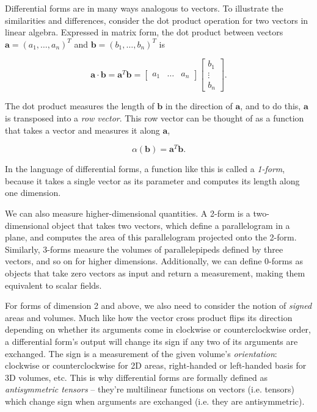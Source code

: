 \documentclass[utf8,english]{gradu3}
\begin{document}
Differential forms are in many ways analogous to vectors.
To illustrate the similarities and differences,
consider the dot product operation
for two vectors in linear algebra.
Expressed in matrix form, the dot product between vectors
$\mathbf{a} = (a_1, \dots, a_n)^T$ and $\mathbf{b} = (b_1, \dots, b_n)^T$
is

\[
  \mathbf{a} \cdot \mathbf{b} = \mathbf{a}^T \mathbf{b}
  = \begin{bmatrix}
    a_1 & \dots & a_n
  \end{bmatrix}
  \begin{bmatrix}
    b_1 \\ \vdots \\ b_n
  \end{bmatrix}.
\]

The dot product measures the length of $\mathbf{b}$ in the direction of $\mathbf{a}$,
and to do this, $\mathbf{a}$ is transposed into a \textit{row vector}.
This row vector can be thought of as a function
that takes a vector and measures it along $\mathbf{a}$,

\[
  \alpha(\mathbf{b}) = \mathbf{a}^T \mathbf{b}.
\]

In the language of differential forms,
a function like this is called a \textit{1-form},
because it takes a single vector as its parameter
and computes its length along one dimension.

We can also measure higher-dimensional quantities.
A 2-form is a two-dimensional object that takes two vectors,
which define a parallelogram in a plane,
and computes the area of this parallelogram
projected onto the 2-form.
Similarly, 3-forms measure the volumes of parallelepipeds
defined by three vectors, and so on for higher dimensions.
Additionally, we can define 0-forms
as objects that take zero vectors as input and return a measurement,
making them equivalent to scalar fields.

For forms of dimension 2 and above, we also need to consider
the notion of \textit{signed} areas and volumes.
Much like how the vector cross product flips its direction
depending on whether its arguments come in clockwise or counterclockwise order,
a differential form's output will change its sign
if any two of its arguments are exchanged.
The sign is a measurement of the given volume's \textit{orientation}:
clockwise or counterclockwise for 2D areas,
right-handed or left-handed basis for 3D volumes, etc.
This is why differential forms are formally defined as \textit{antisymmetric tensors}
-- they're multilinear functions on vectors (i.e. tensors)
which change sign when arguments are exchanged (i.e. they are antisymmetric).
\end{document}

